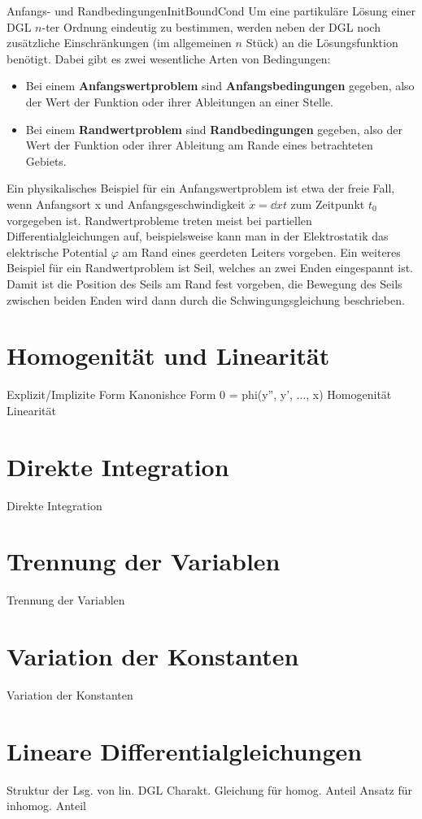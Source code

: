\begin{definition}{Anfangs- und Randbedingungen}{InitBoundCond}
    Um eine partikuläre Lösung einer DGL $n$-ter Ordnung eindeutig zu bestimmen, werden neben der DGL noch zusätzliche Einschränkungen (im allgemeinen $n$ Stück) an die Lösungsfunktion benötigt. Dabei gibt es zwei wesentliche Arten von Bedingungen:
    \begin{itemize}
        \item Bei einem \textbf{Anfangswertproblem} sind \textbf{Anfangsbedingungen} gegeben, also der Wert der Funktion oder ihrer Ableitungen an einer Stelle.
        \item Bei einem \textbf{Randwertproblem} sind \textbf{Randbedingungen} gegeben, also der Wert der Funktion oder ihrer Ableitung am Rande eines betrachteten Gebiets.
    \end{itemize}
\end{definition}

Ein physikalisches Beispiel für ein Anfangswertproblem ist etwa der freie Fall, wenn Anfangsort x und Anfangsgeschwindigkeit $\dot{x} = \dd{x}{t}$ zum Zeitpunkt $t_0$ vorgegeben ist. Randwertprobleme treten meist bei partiellen Differentialgleichungen auf, beispielsweise kann man in der Elektrostatik das elektrische Potential $\varphi$ am Rand eines geerdeten Leiters vorgeben. Ein weiteres Beispiel für ein Randwertproblem ist Seil, welches an zwei Enden eingespannt ist. Damit ist die Position des Seils am Rand fest vorgeben, die Bewegung des Seils zwischen beiden Enden wird dann durch die Schwingungsgleichung beschrieben.

\section{Homogenität und Linearität}

Explizit/Implizite Form
Kanonishce Form 0 = phi(y'', y', ..., x)
Homogenität
Linearität

\section{Direkte Integration}

  Direkte Integration

\section{Trennung der Variablen}

  Trennung der Variablen

\section{Variation der Konstanten}

  Variation der Konstanten

\section{Lineare Differentialgleichungen}

  Struktur der Lsg. von lin. DGL
  Charakt. Gleichung für homog. Anteil
  Ansatz für inhomog. Anteil
